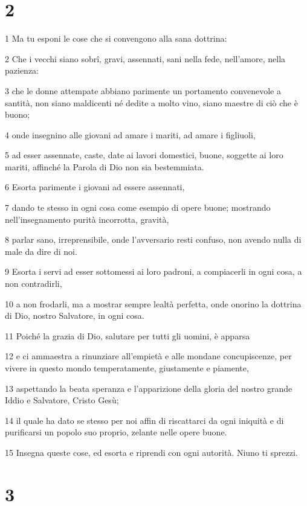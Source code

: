 \chapter{2}

\par 1 Ma tu esponi le cose che si convengono alla sana dottrina:
\par 2 Che i vecchi siano sobrî, gravi, assennati, sani nella fede, nell'amore, nella pazienza:
\par 3 che le donne attempate abbiano parimente un portamento convenevole a santità, non siano maldicenti né dedite a molto vino, siano maestre di ciò che è buono;
\par 4 onde insegnino alle giovani ad amare i mariti, ad amare i figliuoli,
\par 5 ad esser assennate, caste, date ai lavori domestici, buone, soggette ai loro mariti, affinché la Parola di Dio non sia bestemmiata.
\par 6 Esorta parimente i giovani ad essere assennati,
\par 7 dando te stesso in ogni cosa come esempio di opere buone; mostrando nell'insegnamento purità incorrotta, gravità,
\par 8 parlar sano, irreprensibile, onde l'avversario resti confuso, non avendo nulla di male da dire di noi.
\par 9 Esorta i servi ad esser sottomessi ai loro padroni, a compiacerli in ogni cosa, a non contradirli,
\par 10 a non frodarli, ma a mostrar sempre lealtà perfetta, onde onorino la dottrina di Dio, nostro Salvatore, in ogni cosa.
\par 11 Poiché la grazia di Dio, salutare per tutti gli uomini, è apparsa
\par 12 e ci ammaestra a rinunziare all'empietà e alle mondane concupiscenze, per vivere in questo mondo temperatamente, giustamente e piamente,
\par 13 aspettando la beata speranza e l'apparizione della gloria del nostro grande Iddio e Salvatore, Cristo Gesù;
\par 14 il quale ha dato se stesso per noi affin di riscattarci da ogni iniquità e di purificarsi un popolo suo proprio, zelante nelle opere buone.
\par 15 Insegna queste cose, ed esorta e riprendi con ogni autorità. Niuno ti sprezzi.

\chapter{3}

